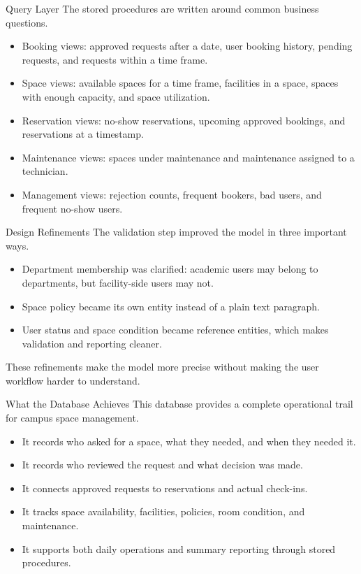 \documentclass[aspectratio=169]{beamer}
\begin{document}
\begin{frame}{Query Layer}
    The stored procedures are written around common business questions.

    \begin{itemize}
        \item Booking views: approved requests after a date, user booking history, pending requests, and requests within a time frame.
        \item Space views: available spaces for a time frame, facilities in a space, spaces with enough capacity, and space utilization.
        \item Reservation views: no-show reservations, upcoming approved bookings, and reservations at a timestamp.
        \item Maintenance views: spaces under maintenance and maintenance assigned to a technician.
        \item Management views: rejection counts, frequent bookers, bad users, and frequent no-show users.
    \end{itemize}
\end{frame}

\begin{frame}{Design Refinements}
    The validation step improved the model in three important ways.

    \begin{itemize}
        \item Department membership was clarified: academic users may belong to departments, but facility-side users may not.
        \item Space policy became its own entity instead of a plain text paragraph.
        \item User status and space condition became reference entities, which makes validation and reporting cleaner.
    \end{itemize}

    \vspace{0.3cm}
    These refinements make the model more precise without making the user workflow
    harder to understand.
\end{frame}

\begin{frame}{What the Database Achieves}
    This database provides a complete operational trail for campus space management.

    \begin{itemize}
        \item It records who asked for a space, what they needed, and when they needed it.
        \item It records who reviewed the request and what decision was made.
        \item It connects approved requests to reservations and actual check-ins.
        \item It tracks space availability, facilities, policies, room condition, and maintenance.
        \item It supports both daily operations and summary reporting through stored procedures.
    \end{itemize}
\end{frame}
\end{document}

